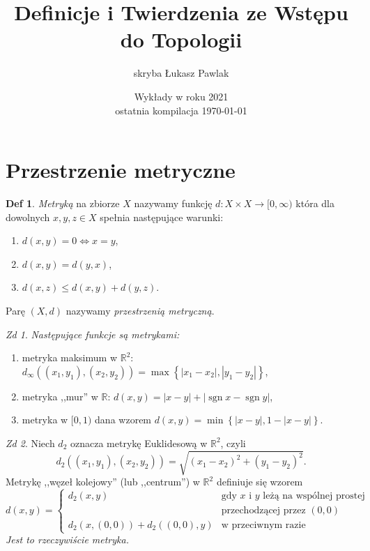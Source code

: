 \documentclass[a4paper, 12pt]{mwart}
\author{skryba Łukasz Pawlak}
\title{Definicje i Twierdzenia ze Wstępu do Topologii}
\date{Wykłady w roku 2021 \\ ostatnia kompilacja \today}
\DeclareMathOperator{\sgn}{sgn}
\theoremstyle{definition}
\newtheorem{definicja}{Def}[section]
\theoremstyle{plain}
\theoremstyle{remark}
\newtheorem{zadanie}{Zd}[section]
\begin{document}
\maketitle
\section{Przestrzenie metryczne}
\begin{definicja}
	\emph{Metryką} na zbiorze $X$ nazywamy funkcję $d\colon X\times X\to [0, \infty)$ która dla dowolnych $x, y, z \in X$ spełnia następujące warunki:
	\begin{enumerate}
		\item $d(x, y) = 0 \iff x = y$,
		\item $d(x, y) = d(y, x)$,
		\item $d(x, z) \leq d(x, y) + d(y, z)$.
	\end{enumerate}
	Parę $(X, d)$ nazywamy \emph{przestrzenią metryczną}.
\end{definicja}
\begin{zadanie}
	\emph{Następujące funkcje są metrykami:}
	\begin{enumerate}
		\item metryka maksimum w $\mathbb{R}^2$: $d_\infty((x_1, y_1), (x_2, y_2)) = \max \left\{|x_1 - x_2|, |y_1 - y_2|\right\}$,
		\item metryka ,,mur'' w $\mathbb{R}$: $d(x, y) = |x - y| + |\sgn x - \sgn y|$,
		\item metryka w $[0, 1)$ dana wzorem $d(x, y) = \min \left\{|x - y|, 1 - |x - y| \right\}$.
	\end{enumerate}
\end{zadanie}
\begin{zadanie}
	Niech $d_2$ oznacza metrykę Euklidesową w $\mathbb{R}^2$, czyli
	\begin{equation}
		d_2((x_1, y_1), (x_2, y_2)) = \sqrt{{(x_1 - x_2)}^2 + {(y_1 - y_2)}^2}.
	\end{equation}
	Metrykę ,,węzeł kolejowy'' (lub ,,centrum'') w $\mathbb{R}^2$ definiuje się wzorem
	\begin{equation}
		d(x, y) = \begin{cases}
			d_2(x, y) & \text{gdy $x$ i $y$ leżą na wspólnej prostej} \\
			& \text{przechodzącej przez $(0, 0)$} \\
			d_2(x, (0, 0)) + d_2((0, 0), y) & \text{w przeciwnym razie}
		\end{cases}
	\end{equation}
	\emph{Jest to rzeczywiście metryka.}
\end{zadanie}
\end{document}
